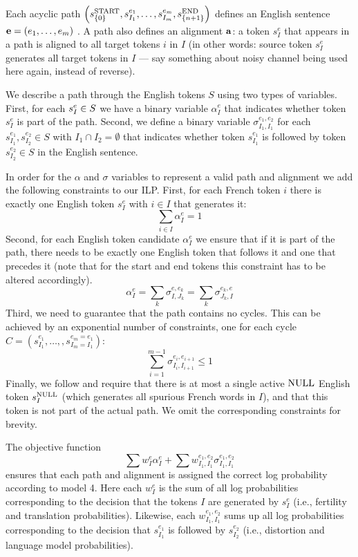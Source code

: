 Each acyclic path $\left(s_{\left\{ 0\right\} }^{\text{START}},s_{I_{1}}^{e_{1}},\ldots,s_{I_{m}}^{e_{m}},s_{\left\{ n+1\right\} }^{\text{END}}\right)$
defines an English sentence $\mathbf{e}=\left(e_{1},\ldots,e_{m}\right)$
. A path also defines an alignment $\mathbf{a}$: a token $s_{I}^{e}$
that appears in a path is aligned to all target tokens $i$ in $I$
(in other words: source token $s_{I}^{e}$ generates all target tokens
in $I$ --- say something about noisy channel being used here again,
instead of reverse).

We describe a path through the English tokens $S$ using two types
of variables. First, for each $s_{I}^{e}\in S$ we have a
binary variable $\alpha_{I}^{e}$ that indicates whether token $s_{I}^{e}$
is part of the path. Second, we define a binary variable $\sigma_{I_{1},I_{1}}^{e_{1},e_{2}}$
for each $s_{I_{1}}^{e_{1}},s_{I_{2}}^{e_{2}}\in S$ with $I_{1}\cap I_{2}=\emptyset$
that indicates whether token $s_{I_{1}}^{e_{1}}$ is followed by token
$s_{I_{2}}^{e_{2}}\in S$ in the English sentence.

In order for the $\alpha$ and $\sigma$ variables to represent a
valid path and alignment we add the following constraints to our ILP.
First, for each French token $i$ there is exactly one English token
$s_{I}^{e}$ with $i\in I$ that generates it: \[
\sum_{i\in I}\alpha_{I}^{e}=1\]
Second, for each English token candidate $\alpha_{I}^{e}$ we ensure
that if it is part of the path, there needs to be exactly one English
token that follows it and one that precedes it (note that for the
start and end tokens this constraint has to be altered accordingly).\[
\alpha_{I}^{e}=\sum_{k}\sigma_{I,J_{k}}^{e,e_{k}}=\sum_{k}\sigma_{J_{k},I}^{e_{k},e}\]
Third, we need to guarantee that the path contains no cycles. This
can be achieved by an exponential number of constraints, one for each
cycle $C=\left(s_{I_{1}}^{e_{1}},\ldots,,s_{I_{m}=I_{1}}^{e_{m}=e_{1}}\right)$:
\[
\sum_{i=1}^{m-1}\sigma_{I_{i},I_{i+1}}^{e_{i},e_{i+1}}\leq1\]
Finally, we follow \citet{germann01fast} and require that there is
at most a single active $\text{NULL}$ English token $s_{I}^{\text{NULL}}$ (which
generates all spurious French words in $I$), and that this token
is not part of the actual path. We omit the corresponding constraints
for brevity.

The objective function\[
\sum w_{I}^{e}\alpha_{I}^{e}+\sum w_{I_{1},I_{1}}^{e_{1},e_{2}}\sigma_{I_{1},I_{1}}^{e_{1},e_{2}}\]
ensures that each path and alignment is assigned the correct log probability
according to model 4. Here each $w_{I}^{e}$ is the sum of all log
probabilities corresponding to the decision that the tokens $I$ are
generated by $s_{I}^{e}$ (i.e., fertility and translation probabilities).
Likewise, each $w_{I_{1},I_{1}}^{e_{1},e_{2}}$ sums up all log probabilities
corresponding to the decision that $s_{I_{1}}^{e_{1}}$ is followed
by $s_{I_{2}}^{e_{2}}$ (i.e., distortion and language model probabilities).


